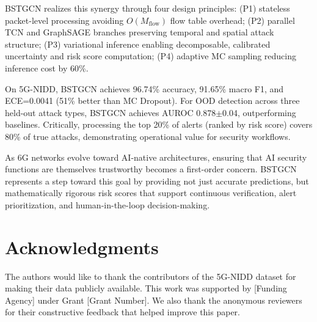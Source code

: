 \documentclass[lettersize,journal]{IEEEtran}
\begin{document}
BSTGCN realizes this synergy through four design principles: (P1) stateless packet-level processing avoiding $O(M_{\text{flow}})$ flow table overhead; (P2) parallel TCN and GraphSAGE branches preserving temporal and spatial attack structure; (P3) variational inference enabling decomposable, calibrated uncertainty and risk score computation; (P4) adaptive MC sampling reducing inference cost by 60\%.

On 5G-NIDD, BSTGCN achieves 96.74\% accuracy, 91.65\% macro F1, and ECE=0.0041 (51\% better than MC Dropout). For OOD detection across three held-out attack types, BSTGCN achieves AUROC 0.878$\pm$0.04, outperforming baselines. Critically, processing the top 20\% of alerts (ranked by risk score) covers 80\% of true attacks, demonstrating operational value for security workflows.

As 6G networks evolve toward AI-native architectures, ensuring that AI security functions are themselves trustworthy becomes a first-order concern. BSTGCN represents a step toward this goal by providing not just accurate predictions, but mathematically rigorous risk scores that support continuous verification, alert prioritization, and human-in-the-loop decision-making.

\section*{Acknowledgments}
The authors would like to thank the contributors of the 5G-NIDD dataset for making their data publicly available. This work was supported by [Funding Agency] under Grant [Grant Number]. We also thank the anonymous reviewers for their constructive feedback that helped improve this paper.






\end{document}
